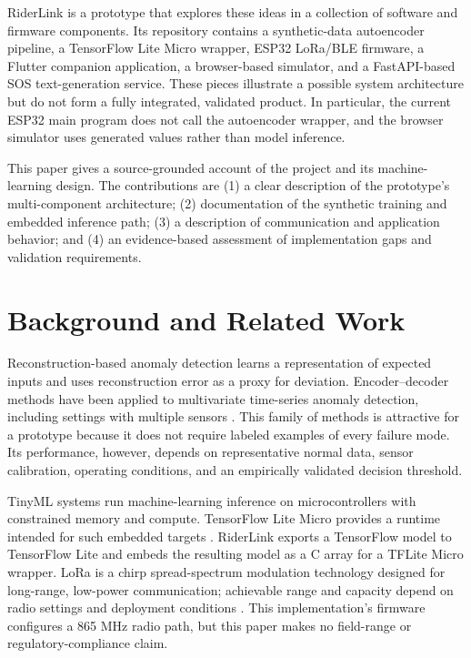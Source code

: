 \documentclass[conference]{IEEEtran}
\begin{document}
RiderLink is a prototype that explores these ideas in a collection of software and firmware components. Its repository contains a synthetic-data autoencoder pipeline, a TensorFlow Lite Micro wrapper, ESP32 LoRa/BLE firmware, a Flutter companion application, a browser-based simulator, and a FastAPI-based SOS text-generation service. These pieces illustrate a possible system architecture but do not form a fully integrated, validated product. In particular, the current ESP32 main program does not call the autoencoder wrapper, and the browser simulator uses generated values rather than model inference.

This paper gives a source-grounded account of the project and its machine-learning design. The contributions are (1) a clear description of the prototype's multi-component architecture; (2) documentation of the synthetic training and embedded inference path; (3) a description of communication and application behavior; and (4) an evidence-based assessment of implementation gaps and validation requirements.

\section{Background and Related Work}
Reconstruction-based anomaly detection learns a representation of expected inputs and uses reconstruction error as a proxy for deviation. Encoder--decoder methods have been applied to multivariate time-series anomaly detection, including settings with multiple sensors \cite{malhotra2016}. This family of methods is attractive for a prototype because it does not require labeled examples of every failure mode. Its performance, however, depends on representative normal data, sensor calibration, operating conditions, and an empirically validated decision threshold.

TinyML systems run machine-learning inference on microcontrollers with constrained memory and compute. TensorFlow Lite Micro provides a runtime intended for such embedded targets \cite{david2021}. RiderLink exports a TensorFlow model to TensorFlow Lite and embeds the resulting model as a C array for a TFLite Micro wrapper. LoRa is a chirp spread-spectrum modulation technology designed for long-range, low-power communication; achievable range and capacity depend on radio settings and deployment conditions \cite{semtech2015}. This implementation's firmware configures a 865 MHz radio path, but this paper makes no field-range or regulatory-compliance claim.
\end{document}
